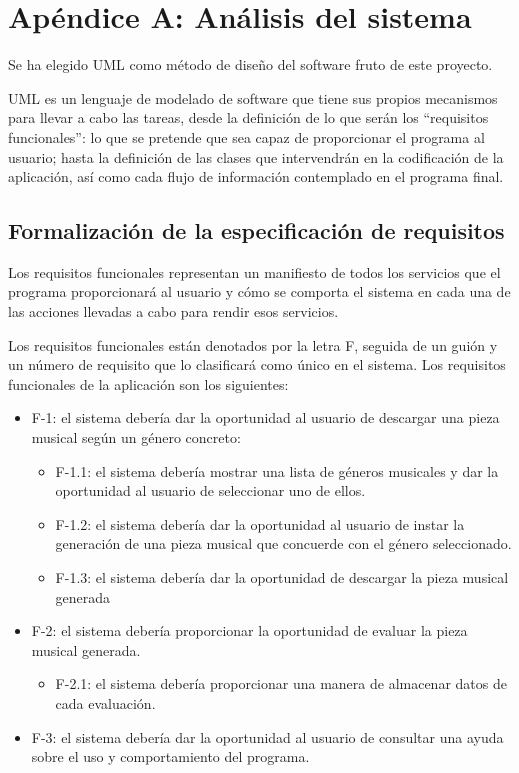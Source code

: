 \chapter{Apéndice A: Análisis del sistema}
\label{apendice-a}

Se ha elegido UML como método de diseño del software fruto de este proyecto.

UML es un lenguaje de modelado de software que tiene sus propios mecanismos para llevar a cabo las tareas, desde la definición de lo
que serán los ``requisitos funcionales'': lo que se pretende que sea capaz de proporcionar el programa al usuario; hasta la definición de las clases que intervendrán en la codificación de la aplicación, así como cada flujo de información contemplado en el programa final.

\section{Formalización de la especificación de requisitos}

Los requisitos funcionales representan un manifiesto de todos los servicios que el programa proporcionará al usuario y cómo se comporta el sistema en cada una de las acciones llevadas a cabo para rendir esos servicios.

Los requisitos funcionales están denotados por la letra F, seguida de un guión y un número de requisito que lo clasificará como único en el sistema. Los requisitos funcionales de la aplicación son los siguientes:

\begin{itemize}

    \item F-1: el sistema debería dar la oportunidad al usuario de descargar una pieza musical según un género concreto:
    \begin{itemize}
        \item F-1.1: el sistema debería mostrar una lista de géneros musicales y dar la oportunidad al usuario de seleccionar uno de ellos.
        \item F-1.2: el sistema debería dar la oportunidad al usuario de instar la generación de una pieza musical que concuerde con el género seleccionado.
        \item F-1.3: el sistema debería dar la oportunidad de descargar la pieza musical generada
    \end{itemize}
    
    \item F-2: el sistema debería proporcionar la oportunidad de evaluar la pieza musical generada.
    \begin{itemize}
        \item F-2.1: el sistema debería proporcionar una manera de almacenar datos de cada evaluación.
    \end{itemize}
       
    \item F-3: el sistema debería dar la oportunidad al usuario de consultar una ayuda sobre el uso y comportamiento del programa.

\end{itemize}

